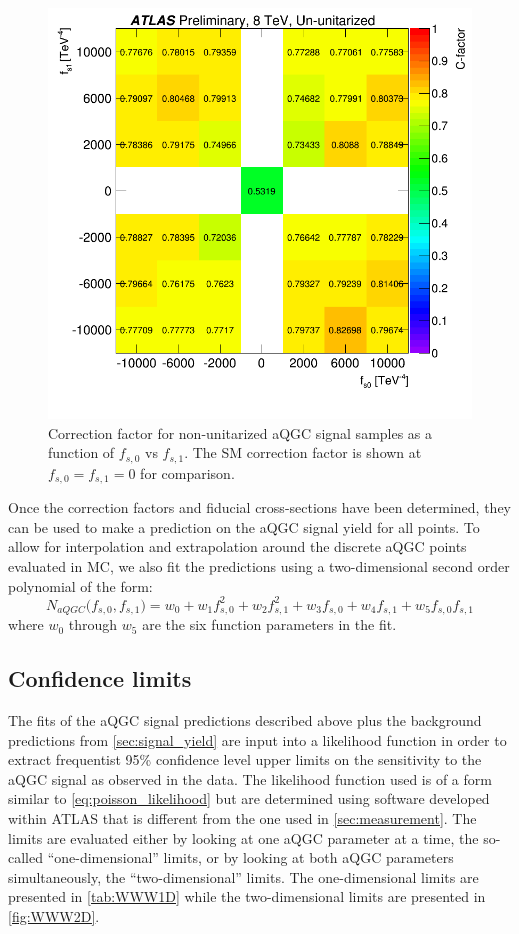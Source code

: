 \begin{figure}[ht!]
\centering
\includegraphics[width=.8\textwidth]{figures/aQGC/cfactor_chargesum.png}
\caption{Correction factor for non-unitarized aQGC signal samples as a function of $f_{s,0}$ vs $f_{s,1}$.
The SM correction factor is shown at $f_{s,0}=f_{s,1}=0$ for comparison.}
\label{fig:aqgc_cfactor_3l}
\end{figure}


Once the correction factors and fiducial cross-sections have been determined,
they can be used to make a prediction on the aQGC signal yield 
for all points.  To allow for interpolation and extrapolation
around the discrete aQGC points evaluated in MC, we also 
fit the predictions using a two-dimensional second order polynomial of 
the form:
\begin{equation}
N_{aQGC}\big(f_{s,0},f_{s,1}\big) = w_0 + w_1 f_{s,0}^2 + w_2 f_{s,1}^2
+ w_3 f_{s,0} + w_4  f_{s,1} + w_5 f_{s,0} f_{s,1}
\end{equation}
where $w_0$ through $w_5$ are the six function parameters in the fit.




\subsection{Confidence limits}

The fits of the aQGC signal predictions described above plus the background predictions
from \sec\ref{sec:signal_yield} are input into a likelihood function
in order to extract frequentist 95\% confidence level upper limits on the 
sensitivity to the aQGC signal as observed in the data.
The likelihood function used is of a form similar to \eqn\eqref{eq:poisson_likelihood}
but are determined using software developed within ATLAS \cite{tgclim} that is different
from the one used in \sec\ref{sec:measurement}.
The limits are evaluated either by looking at one aQGC 
parameter at a time, the so-called ``one-dimensional''
limits, or by looking at both aQGC parameters simultaneously, the 
``two-dimensional'' limits. The one-dimensional limits
are presented in \tab\ref{tab:WWW1D}
while the two-dimensional limits are presented in 
\fig\ref{fig:WWW2D}.
  
